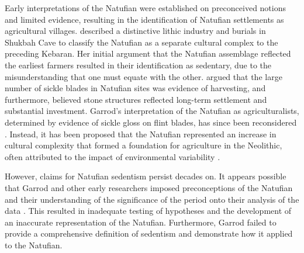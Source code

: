 Early interpretations of the Natufian were established on preconceived notions and limited evidence, resulting in the identification of Natufian settlements as agricultural villages. \textcite{Garrod_1957} described a distinctive lithic industry and burials in Shukbah Cave to classify the Natufian as a separate cultural complex to the preceding Kebaran. Her initial argument that the Natufian assemblage reflected the earliest farmers resulted in their identification as sedentary, due to the misunderstanding that one must equate with the other. 
\textcite{Garrod_1957} argued that the large number of sickle blades in Natufian sites was evidence of harvesting, and furthermore, believed stone structures reflected long-term settlement and substantial investment. 
Garrod’s interpretation of the Natufian as agriculturalists, determined by evidence of sickle gloss on flint blades, has since been reconsidered \parencite[75]{Lieberman_1999}. 
Instead, it has been proposed that the Natufian represented an increase in cultural complexity that formed a foundation for agriculture in the Neolithic, often attributed to the impact of environmental variability \parencite[447]{Bar-Yosef_1989}. 

However, claims for Natufian sedentism persist decades on. It appears possible that Garrod and other early researchers imposed preconceptions of the Natufian and their understanding of the significance of the period onto their analysis of the data \parencite{Finlayson_2013}.
This resulted in inadequate testing of hypotheses and the development of an inaccurate representation of the Natufian. Furthermore, Garrod failed to provide a comprehensive definition of sedentism and demonstrate how it applied to the Natufian.

